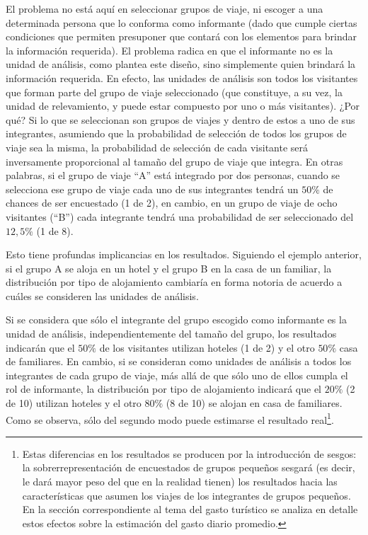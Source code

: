 \documentclass[
]{book}
\begin{document}
El problema no está aquí en seleccionar grupos de viaje, ni escoger a una determinada persona que lo conforma como informante (dado que cumple ciertas condiciones que permiten presuponer que contará con los elementos para brindar la información requerida). El problema radica en que el informante no es la unidad de análisis, como plantea este diseño, sino simplemente quien brindará la información requerida. En efecto, las unidades de análisis son todos los visitantes que forman parte del grupo de viaje seleccionado (que constituye, a su vez, la unidad de relevamiento, y puede estar compuesto por uno o más visitantes). ¿Por qué? Si lo que se seleccionan son grupos de viajes y dentro de estos a uno de sus integrantes, asumiendo que la probabilidad de selección de todos los grupos de viaje sea la misma, la probabilidad de selección de cada visitante será inversamente proporcional al tamaño del grupo de viaje que integra. En otras palabras, si el grupo de viaje ``A'' está integrado por dos personas, cuando se selecciona ese grupo de viaje cada uno de sus integrantes tendrá un \(50\%\) de chances de ser encuestado (1 de 2), en cambio, en un grupo de viaje de ocho visitantes (``B'') cada integrante tendrá una probabilidad de ser seleccionado del \(12,5\%\) (1 de 8).

Esto tiene profundas implicancias en los resultados. Siguiendo el ejemplo anterior, si el grupo A se aloja en un hotel y el grupo B en la casa de un familiar, la distribución por tipo de alojamiento cambiaría en forma notoria de acuerdo a cuáles se consideren las unidades de análisis.

Si se considera que sólo el integrante del grupo escogido como informante es la unidad de análisis, independientemente del tamaño del grupo, los resultados indicarán que el \(50\%\) de los visitantes utilizan hoteles (1 de 2) y el otro \(50\%\) casa de familiares. En cambio, si se consideran como unidades de análisis a todos los integrantes de cada grupo de viaje, más allá de que sólo uno de ellos cumpla el rol de informante, la distribución por tipo de alojamiento indicará que el \(20\%\) (2 de 10) utilizan hoteles y el otro \(80\%\) (8 de 10) se alojan en casa de familiares. Como se observa, sólo del segundo modo puede estimarse el resultado real\footnote{Estas diferencias en los resultados se producen por la introducción de sesgos: la sobrerrepresentación de encuestados de grupos pequeños sesgará (es decir, le dará mayor peso del que en la realidad tienen) los resultados hacia las características que asumen los viajes de los integrantes de grupos pequeños. En la sección correspondiente al tema del gasto turístico se analiza en detalle estos efectos sobre la estimación del gasto diario promedio.}.\\
\end{document}
